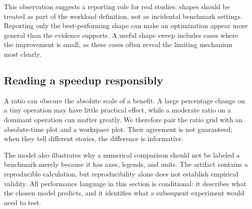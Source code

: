 This observation suggests a reporting rule for real studies: shapes should be treated as part of the workload definition, not as incidental benchmark settings. Reporting only the best-performing shape can make an optimization appear more general than the evidence supports. A useful shape sweep includes cases where the improvement is small, as these cases often reveal the limiting mechanism most clearly.

\subsection{Reading a speedup responsibly}
A ratio can obscure the absolute scale of a benefit. A large percentage change on a tiny operation may have little practical effect, while a moderate ratio on a dominant operation can matter greatly. We therefore pair the ratio grid with an absolute-time plot and a workspace plot. Their agreement is not guaranteed; when they tell different stories, the difference is informative.

The model also illustrates why a numerical comparison should not be labeled a benchmark merely because it has axes, legends, and units. The artifact contains a reproducible calculation, but reproducibility alone does not establish empirical validity. All performance language in this section is conditional: it describes what the chosen model predicts, and it identifies what a subsequent experiment would need to test.
